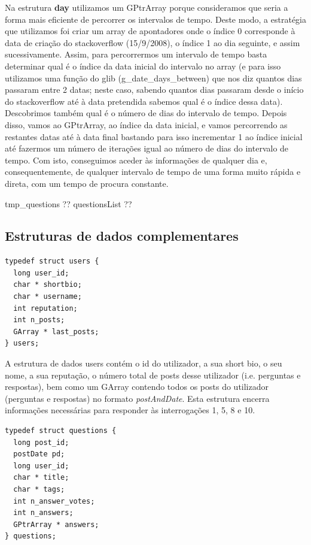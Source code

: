 \documentclass[a4paper]{article}
\begin{document}
Na estrutura \textbf{day} utilizamos um GPtrArray porque consideramos que seria
a forma mais eficiente de percorrer os intervalos de tempo. Deste modo,
a estratégia que utilizamos foi criar um array de apontadores onde o
índice 0 corresponde à data de criação do stackoverflow (15/9/2008),
o índice 1 ao dia seguinte, e assim sucessivamente. Assim, para percorrermos
um intervalo de tempo basta determinar qual é o índice da data inicial do
intervalo no array (e para isso utilizamos uma função do glib
(g\_date\_days\_between) que nos diz quantos dias passaram entre 2 datas;
neste caso, sabendo quantos dias passaram desde o início do stackoverflow
até à data pretendida
sabemos qual é o índice dessa data). Descobrimos também qual é o número de
dias do intervalo de tempo. Depois disso, vamos ao GPtrArray, ao índice da
data inicial, e vamos percorrendo as restantes datas até à data final
bastando para isso incrementar 1 ao índice inicial até fazermos
um número de iterações igual ao número de dias do intervalo de tempo.
Com isto, conseguimos aceder às informações de qualquer dia e, consequentemente,
de qualquer intervalo de tempo de uma forma muito rápida e direta,
com um tempo de procura constante. \par

tmp\_questions ??
questionsList ??

\subsection{Estruturas de dados complementares}
\label{sec:dados_complementares}

\begin{verbatim}
typedef struct users {
  long user_id;
  char * shortbio;
  char * username;
  int reputation;
  int n_posts;
  GArray * last_posts;
} users;
\end{verbatim}

A estrutura de dados users contém o id do utilizador, a sua short bio, o seu nome,
a sua reputação, o número total de posts desse utilizador (i.e. perguntas e respostas),
bem como um GArray contendo todos os posts do utilizador (perguntas e respostas) no
formato \textit{postAndDate}.
Esta estrutura encerra informações necessárias para responder às interrogações 1,
5, 8 e 10.

\begin{verbatim}
typedef struct questions {
  long post_id;
  postDate pd;
  long user_id;
  char * title;
  char * tags;
  int n_answer_votes;
  int n_answers;
  GPtrArray * answers;
} questions;
\end{verbatim}
\end{document}

